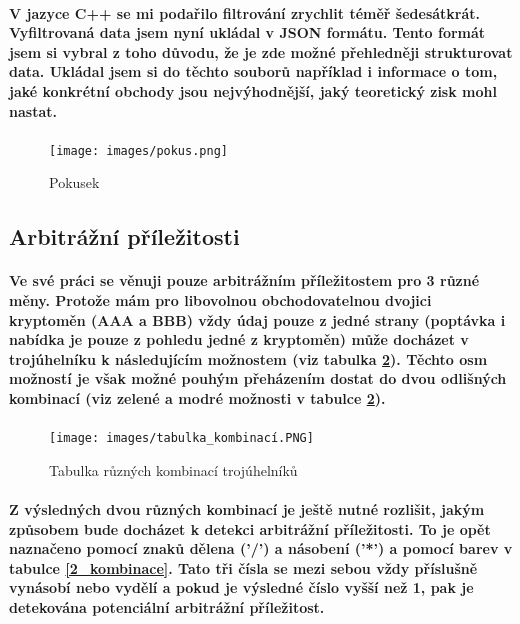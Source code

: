 \documentclass[thesis=B,czech]{FITthesis}[2019/03/21]
\begin{document}
\paragraph{
V jazyce C++ se mi podařilo filtrování zrychlit téměř šedesátkrát. Vyfiltrovaná data jsem nyní ukládal v JSON formátu. Tento formát jsem si vybral z toho důvodu, že je zde možné přehledněji strukturovat data. Ukládal jsem si do těchto souborů například i informace o tom, jaké konkrétní obchody jsou nejvýhodnější, jaký teoretický zisk mohl nastat. 
}
\begin{figure}\centering
	\texttt{[image: images/pokus.png]}
	\caption{Pokusek}\label{fig:pokus}
\end{figure}
\subsection{Arbitrážní příležitosti}
\paragraph{
Ve své práci se věnuji pouze arbitrážním příležitostem pro 3 různé měny. Protože mám pro libovolnou obchodovatelnou dvojici kryptoměn (AAA a BBB) vždy údaj pouze z jedné strany (poptávka i nabídka je pouze z pohledu jedné z kryptoměn) může docházet v trojúhelníku k následujícím možnostem (viz tabulka \ref{tabulka_kombinaci}). Těchto osm možností je však možné pouhým přeházením dostat do dvou odlišných kombinací (viz zelené a modré možnosti v tabulce \ref{tabulka_kombinaci}).
}
\begin{figure}\centering
	\texttt{[image: images/tabulka\_kombinací.PNG]}
	\caption{Tabulka různých kombinací trojúhelníků}\label{tabulka_kombinaci}
\end{figure}
\paragraph{
Z výsledných dvou různých kombinací je ještě nutné rozlišit, jakým způsobem bude docházet k detekci arbitrážní příležitosti. To je opět naznačeno pomocí znaků dělena ('/') a násobení ('*') a pomocí barev v tabulce \ref{2_kombinace}. Tato tři čísla se mezi sebou vždy příslušně vynásobí nebo vydělí a pokud je výsledné číslo vyšší než 1, pak je detekována potenciální arbitrážní příležitost. 
}
\end{document}
